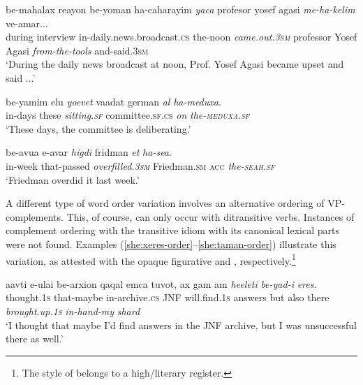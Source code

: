 \documentclass[output=paper]{langsci/langscibook}
\begin{document}
    \ea\label{she:yaca-v2}
        \gll be-mahalax re{\alef}ayon be-yoman ha-caharayim \textit{yaca} profesor yosef {\alef}agasi \textit{me-ha-kelim} ve-amar...\\
            during interview in-daily.news.broadcast.\textsc{cs} the-noon \textit{came.out.\textsc{3sm}} professor Yosef Agasi \textit{from-the-tools} and-said.\textsc{3sm} \\
        \glt `During the daily news broadcast at noon, Prof. Yosef Agasi became upset and said ...'
    \z

    \ea\label{she:meduxa-v2}
        \gll be-yamim {\alef}elu \textit{yo{\shin}evet} va{\ayin}adat german \textit{{\ayin}al} \textit{ha-meduxa}.\\
            in-days these \textit{sitting.\textsc{sf}} committee.\textsc{sf}.\textsc{cs}  \textit{on} \textit{the-\textsc{meduxa}.\textsc{sf}}\\
        \glt `These days, the  committee is deliberating.'
    \z

    \ea\label{she:sea-v2}
        \gll be-{\shin}avu{\ayin}a {\shin}e-{\ayin}avar \textit{higdi{\shin}} fridman \textit{{\alef}et} \textit{ha-se{\alef}a}.\\
            in-week that-passed \textit{overfilled.\textsc{3sm}} Friedman.\textsc{sm} \textsc{acc} \textit{the-\textsc{seah}.\textsc{sf}}\\
        \glt `Friedman overdid it last week.'
    \z

A different type of word order variation involves an alternative ordering of VP-complements. This, of course, can only occur with ditransitive verbs. Instances of complement ordering with the transitive idiom  with its canonical lexical parts were not found. Examples (\ref{she:xeres-order}--\ref{she:taman-order}) illustrate this variation, as attested with the opaque figurative   and , respectively.\footnote{The style of  belongs to a high\slash literary register.}

	\ea\label{she:xeres-order}
    	\gll {\het}a{\shin}avti {\shin}e-{\alef}ulai be-{\alef}arxion qaqal {\alef}emca t{\shin}uvot, {\alef}ax gam {\shin}am \textit{he{\ayin}eleti} \textit{be-yad-i} \textit{{\het}eres}.\\
    	   thought.\textsc{1s} that-maybe in-archive.\textsc{cs} JNF will.find.\textsc{1s} answers but also there \textit{brought.up.\textsc{1s}} \textit{in-hand-my} \textit{shard}\\
    	\glt `I thought that maybe I'd find answers in the JNF archive, but I was unsuccessful there as well.'
	\z
\end{document}
